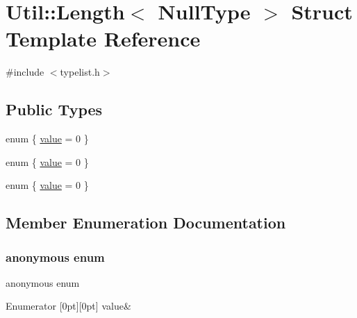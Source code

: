 \hypertarget{structUtil_1_1TL_1_1Length_3_01NullType_01_4}{}\section{Util\+:\+:Length$<$ Null\+Type $>$ Struct Template Reference}
\label{structUtil_1_1TL_1_1Length_3_01NullType_01_4}


{\ttfamily \#include $<$typelist.\+h$>$}

\subsection*{Public Types}
\begin{DoxyCompactItemize}
\item 
enum \{ \mbox{\hyperlink{structUtil_1_1TL_1_1Length_3_01NullType_01_4_a4c0260a5aca87ef464143138cafa1cc1a61d625fe199814f6443a5c37c7b429a4}{value}} = 0
 \}
\item 
enum \{ \mbox{\hyperlink{structUtil_1_1TL_1_1Length_3_01NullType_01_4_a4c0260a5aca87ef464143138cafa1cc1a61d625fe199814f6443a5c37c7b429a4}{value}} = 0
 \}
\item 
enum \{ \mbox{\hyperlink{structUtil_1_1TL_1_1Length_3_01NullType_01_4_a4c0260a5aca87ef464143138cafa1cc1a61d625fe199814f6443a5c37c7b429a4}{value}} = 0
 \}
\end{DoxyCompactItemize}


\subsection{Member Enumeration Documentation}
\mbox{\label{structUtil_1_1TL_1_1Length_3_01NullType_01_4_abfac2723723663dccd5a61f3fe8c3a28}} 
\subsubsection{\texorpdfstring{anonymous enum}{anonymous enum}}
{\footnotesize\ttfamily anonymous enum}

\begin{DoxyEnumFields}{Enumerator}
[0pt][0pt]{}\mbox{\label{structUtil_1_1TL_1_1Length_3_01NullType_01_4_a4c0260a5aca87ef464143138cafa1cc1a61d625fe199814f6443a5c37c7b429a4}} 
value&\\
\hline

\end{DoxyEnumFields}
\mbox{\label{structUtil_1_1TL_1_1Length_3_01NullType_01_4_a042bb471496a540cbcc9a9441edd3b6e}} 

